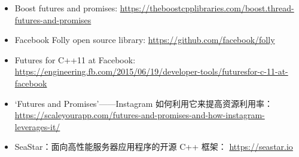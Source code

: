 
\begin{itemize}
\item
Boost futures and promises:  \url{https://theboostcpplibraries.com/boost.thread-futures-and-promises}

\item
Facebook Folly open source library: \url{https://github.com/facebook/folly}

\item
Futures for C++11 at Facebook: \url{https://engineering.fb.com/2015/06/19/developer-tools/futuresfor-c-11-at-facebook}

\item
‘Futures and Promises’——Instagram 如何利用它来提高资源利用率： \url{https://scaleyourapp.com/futures-and-promises-and-how-instagram- leverages-it/}

\item
SeaStar：面向高性能服务器应用程序的开源 C++ 框架： \url{https://seastar.io}
\end{itemize}